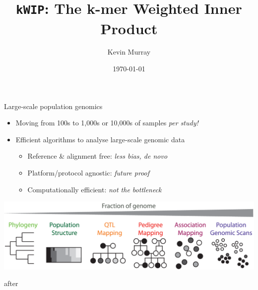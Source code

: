\documentclass[t]{beamer}
\title{\texttt{kWIP}: The k-mer Weighted Inner Product}
\author{Kevin Murray}
\institute{Borevitz Lab, ANU}
\date{\today}
\begin{document}
{
\begin{frame}
  \titlepage
  \vfill
\end{frame}
}

\begin{frame}{Large-scale population genomics}
  \begin{itemize}
    \item Moving from 100s to 1,000s or 10,000s of samples \emph{per study!}
    \item Efficient algorithms to analyse large-scale genomic data
    \begin{itemize}
      \item Reference \& alignment free: \textit{less bias, de novo}
      \item Platform/protocol agnostic: \textit{future proof}
      \item Computationally efficient: \textit{not the bottleneck}
    \end{itemize}
  \end{itemize}
  \begin{center}
    \includegraphics[width=\textwidth]{img/cross-scale.png}
  \end{center}
  \tiny{after \textcite{peterson_double_2012}}
\end{frame}
\end{document}
